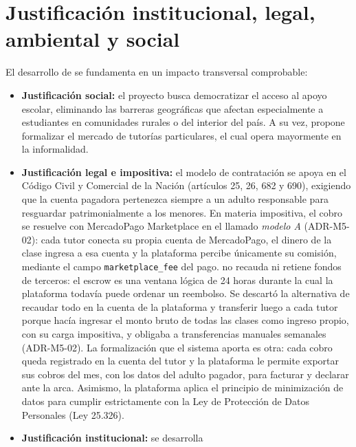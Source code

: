 \section{Justificación institucional, legal, ambiental y social}

El desarrollo de \sistema{} se fundamenta en un impacto transversal
comprobable:

\begin{itemize}
    \item \textbf{Justificación social:} el proyecto busca democratizar el
          acceso al apoyo escolar, eliminando las barreras geográficas
          que afectan especialmente a estudiantes en comunidades rurales o
          del interior del país. A su vez, propone formalizar el mercado
          de tutorías particulares, el cual opera mayormente en la
          informalidad.
    \item \textbf{Justificación legal e impositiva:} el modelo de
          contratación se apoya en el Código Civil y Comercial de la
          Nación (artículos 25, 26, 682 y 690), exigiendo que la cuenta
          pagadora pertenezca siempre a un adulto responsable para
          resguardar patrimonialmente a los menores. En materia
          impositiva, el cobro se resuelve con MercadoPago Marketplace en
          el llamado \emph{modelo A} (ADR-M5-02): cada tutor conecta su
          propia cuenta de MercadoPago, el dinero de la clase ingresa a
          esa cuenta y la plataforma percibe únicamente su comisión,
          mediante el campo \texttt{marketplace\_fee} del pago. \sistema{}
          no recauda ni retiene fondos de terceros: el \gls{escrow} es una
          ventana lógica de 24 horas durante la cual la plataforma todavía
          puede ordenar un reembolso. Se descartó la alternativa de
          recaudar todo en la cuenta de la plataforma y transferir luego a
          cada tutor porque hacía ingresar el monto bruto de todas las
          clases como ingreso propio, con su carga impositiva, y obligaba a
          transferencias manuales semanales (ADR-M5-02). La formalización
          que el sistema aporta es otra: cada cobro queda registrado en la
          cuenta del tutor y la plataforma le permite exportar sus cobros
          del mes, con los datos del adulto pagador, para facturar y
          declarar ante la \gls{arca}. Asimismo, la plataforma aplica el principio de
          minimización de datos para cumplir estrictamente con la Ley de
          Protección de Datos Personales (Ley 25.326).
    \item \textbf{Justificación institucional:} \sistema{} se desarrolla

\end{itemize}
